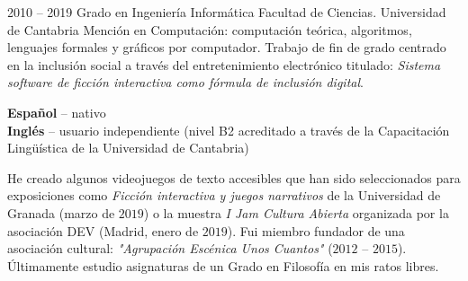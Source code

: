 \documentclass[9pt]{developercv} %
\begin{document}
%
%


\begin{entrylist}
	\entry
		{2010 -- 2019}
		{Grado en Ingeniería Informática}
		{Facultad de Ciencias. Universidad de Cantabria}
		{Mención en Computación: computación teórica, algoritmos, lenguajes formales y gráficos por computador. Trabajo de fin de grado centrado en la inclusión social a través del entretenimiento electrónico titulado: \emph{Sistema software de ficción interactiva como fórmula de inclusión digital}.}
\end{entrylist}

%
%

\begin{minipage}[t]{0.35\textwidth}
	\vspace{-\baselineskip} %

	
	\textbf{Español} -- nativo\\
	\textbf{Inglés} -- usuario independiente (nivel B2 acreditado a través de la Capacitación Lingüística de la Universidad de Cantabria)\\
\end{minipage}
\hfill
\begin{minipage}[t]{0.6\textwidth}
	\vspace{-\baselineskip} %
	

	He creado algunos videojuegos de texto accesibles que han sido seleccionados para exposiciones como \emph{Ficción interactiva y juegos narrativos} de la Universidad de Granada (marzo de $2019$) o la muestra \emph{I Jam Cultura Abierta} organizada por la asociación DEV (Madrid, enero de $2019$). Fui miembro fundador de una asociación cultural: \emph{"Agrupación Escénica Unos Cuantos"} ($2012$ -- $2015$). Últimamente estudio asignaturas de un Grado en Filosofía en mis ratos libres.
\end{minipage}
	

\end{document}
